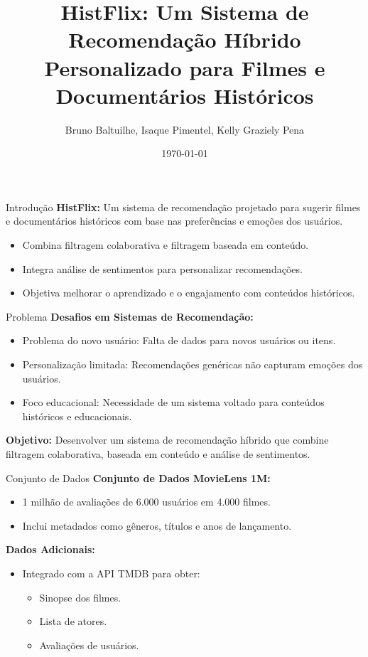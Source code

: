 \documentclass{beamer}
\title[HistFlix: Sistema de Recomendação Híbrido]{HistFlix: Um Sistema de Recomendação Híbrido Personalizado para Filmes e Documentários Históricos}
\author{Bruno Baltuilhe, Isaque Pimentel, Kelly Graziely Pena}
\institute{Universidade Presbiteriana Mackenzie}
\date{\today}
\begin{document}
\begin{frame}
    \titlepage
\end{frame}

\begin{frame}{Introdução}
    \textbf{HistFlix:} Um sistema de recomendação projetado para sugerir filmes e documentários históricos com base nas preferências e emoções dos usuários.
    \vspace{0.5cm}
    \begin{itemize}
        \item Combina filtragem colaborativa e filtragem baseada em conteúdo.
        \item Integra análise de sentimentos para personalizar recomendações.
        \item Objetiva melhorar o aprendizado e o engajamento com conteúdos históricos.
    \end{itemize}
\end{frame}

\begin{frame}{Problema}
    \textbf{Desafios em Sistemas de Recomendação:}
    \begin{itemize}
        \item Problema do novo usuário: Falta de dados para novos usuários ou itens.
        \item Personalização limitada: Recomendações genéricas não capturam emoções dos usuários.
        \item Foco educacional: Necessidade de um sistema voltado para conteúdos históricos e educacionais.
    \end{itemize}
    \vspace{0.5cm}
    \textbf{Objetivo:} Desenvolver um sistema de recomendação híbrido que combine filtragem colaborativa, baseada em conteúdo e análise de sentimentos.
\end{frame}

\begin{frame}{Conjunto de Dados}
    \textbf{Conjunto de Dados MovieLens 1M:}
    \begin{itemize}
        \item 1 milhão de avaliações de 6.000 usuários em 4.000 filmes.
        \item Inclui metadados como gêneros, títulos e anos de lançamento.
    \end{itemize}
    \vspace{0.5cm}
    \textbf{Dados Adicionais:}
    \begin{itemize}
        \item Integrado com a API TMDB para obter:
        \begin{itemize}
            \item Sinopse dos filmes.
            \item Lista de atores.
            \item Avaliações de usuários.
        \end{itemize}
    \end{itemize}
\end{frame}
\end{document}
